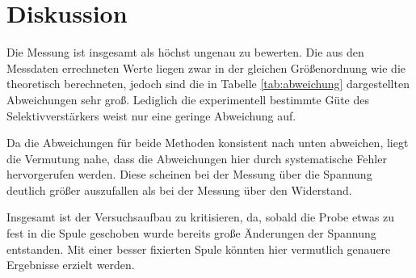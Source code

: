 \section{Diskussion}
\label{sec:Diskussion}

Die Messung ist insgesamt als höchst ungenau zu bewerten. Die aus den Messdaten errechneten
Werte liegen zwar in der gleichen Größenordnung wie die theoretisch berechneten,
jedoch sind die in Tabelle \ref{tab:abweichung} dargestellten Abweichungen sehr groß.
Lediglich die experimentell bestimmte Güte des Selektivverstärkers weist nur eine
geringe Abweichung auf.

Da die Abweichungen für beide Methoden konsistent nach
unten abweichen, liegt die Vermutung nahe, dass die Abweichungen hier durch
systematische Fehler hervorgerufen werden. Diese scheinen bei der Messung
über die Spannung deutlich größer auszufallen als bei der Messung über den
Widerstand.

Insgesamt ist der Versuchsaufbau zu
kritisieren, da, sobald die Probe etwas zu fest in die Spule geschoben wurde bereits
große Änderungen der Spannung entstanden. Mit einer besser fixierten Spule könnten
hier vermutlich genauere Ergebnisse erzielt werden.

